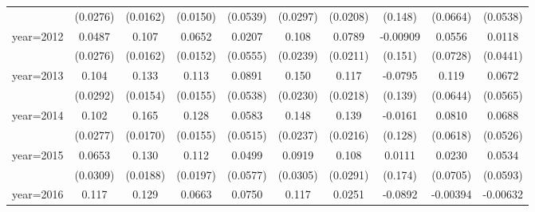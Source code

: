 \begin{table}[htbp]
\begin{tabular}{l*{9}{c}}
                    &    (0.0276)         &    (0.0162)         &    (0.0150)         &    (0.0539)         &    (0.0297)         &    (0.0208)         &     (0.148)         &    (0.0664)         &    (0.0538)         \\
[1em]
year=2012           &      0.0487\sym{*}  &       0.107\sym{***}&      0.0652\sym{***}&      0.0207         &       0.108\sym{***}&      0.0789\sym{***}&    -0.00909         &      0.0556         &      0.0118         \\
                    &    (0.0276)         &    (0.0162)         &    (0.0152)         &    (0.0555)         &    (0.0239)         &    (0.0211)         &     (0.151)         &    (0.0728)         &    (0.0441)         \\
[1em]
year=2013           &       0.104\sym{***}&       0.133\sym{***}&       0.113\sym{***}&      0.0891\sym{*}  &       0.150\sym{***}&       0.117\sym{***}&     -0.0795         &       0.119\sym{*}  &      0.0672         \\
                    &    (0.0292)         &    (0.0154)         &    (0.0155)         &    (0.0538)         &    (0.0230)         &    (0.0218)         &     (0.139)         &    (0.0644)         &    (0.0565)         \\
[1em]
year=2014           &       0.102\sym{***}&       0.165\sym{***}&       0.128\sym{***}&      0.0583         &       0.148\sym{***}&       0.139\sym{***}&     -0.0161         &      0.0810         &      0.0688         \\
                    &    (0.0277)         &    (0.0170)         &    (0.0155)         &    (0.0515)         &    (0.0237)         &    (0.0216)         &     (0.128)         &    (0.0618)         &    (0.0526)         \\
[1em]
year=2015           &      0.0653\sym{**} &       0.130\sym{***}&       0.112\sym{***}&      0.0499         &      0.0919\sym{***}&       0.108\sym{***}&      0.0111         &      0.0230         &      0.0534         \\
                    &    (0.0309)         &    (0.0188)         &    (0.0197)         &    (0.0577)         &    (0.0305)         &    (0.0291)         &     (0.174)         &    (0.0705)         &    (0.0593)         \\
[1em]
year=2016           &       0.117\sym{***}&       0.129\sym{***}&      0.0663\sym{***}&      0.0750         &       0.117\sym{***}&      0.0251         &     -0.0892         &    -0.00394         &    -0.00632         \\

\end{tabular}
\end{table}
